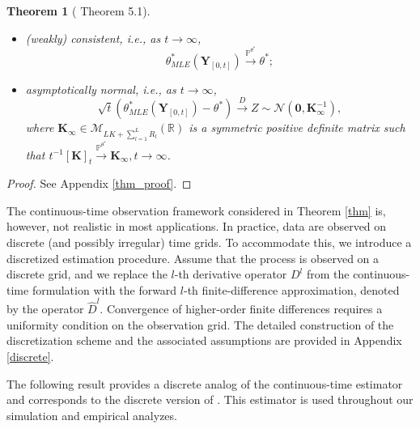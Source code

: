 \documentclass[12pt]{amsart}
\newtheorem{theorem}{Theorem}[section]
\numberwithin{equation}{section}
\newcommand{\1}{\mathbf{1}}
\begin{document}
\begin{theorem}[\cite{lucchese2026estimation} Theorem 5.1]
\begin{itemize}
    \item (weakly) consistent, i.e., as $t\to\infty$,
    \begin{equation*}
\theta_{MLE}^*\left(\mathbf{Y}_{[0,t]}\right)\overset{\mathbb{P}^{\theta^*}}{\longrightarrow}{\theta}^*;
    \end{equation*}
    \item asymptotically normal, i.e., as $t\to\infty$,
    \begin{equation*}
\sqrt{t}\left(\theta_{MLE}^*\left(\mathbf{Y}_{[0,t]}\right)-\theta^*\right)\overset{D}{\longrightarrow}Z\sim \mathcal{N}\left(\mathbf{0},\mathbf{K}_{\infty}^{-1}\right),
    \end{equation*}
where $\mathbf{K}_{\infty}\in\mathcal{M}_{LK+\sum_{l=1}^LR_l}(\mathbb{R})$ is a symmetric positive definite matrix such that $t^{-1}[\mathbf{K}]_t\overset{\mathbb{P}^{\theta^*}}{\longrightarrow}\mathbf{K}_{\infty}, t\to\infty$.
\end{itemize}
\end{theorem}
\begin{proof}
    See Appendix \ref{thm_proof}.
\end{proof}

The continuous-time observation framework considered in Theorem \ref{thm} is, however, not realistic in most applications. In practice, data are observed on discrete (and possibly irregular) time grids. To accommodate this, we introduce a discretized estimation procedure. Assume that the process is observed on a discrete grid, and we replace the $l$-th derivative operator $D^l$ from the continuous-time formulation with the forward $l$-th finite-difference approximation, denoted by the operator $\hat{D}^l$. Convergence of higher-order finite differences requires a uniformity condition on the observation grid. The detailed construction of the discretization scheme and the associated assumptions are provided in Appendix \ref{discrete}.

The following result provides a discrete analog of the continuous-time estimator and corresponds to the discrete version of \cite[Theorem 5.1]{lucchese2026estimation}. This estimator is used throughout our simulation and empirical analyzes.
\end{document}

